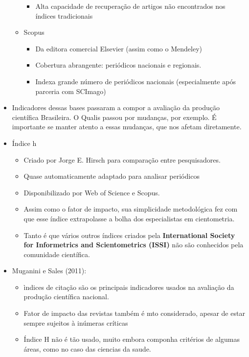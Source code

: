 \documentclass[11pt]{article}
\begin{document}
\begin{itemize}
\begin{itemize}
\begin{itemize}
\item Alta capacidade de recuperação de artigos não encontrados nos índices tradicionais
\end{itemize}

\item Scopus

\begin{itemize}
\item Da editora comercial Elsevier (assim como o Mendeley)

\item Cobertura abrangente: periódicos nacionais e regionais.

\item Indexa grande número de periódicos nacionais (especialmente após parceria com SCImago)
\end{itemize}
\end{itemize}

\item Indicadores dessas bases passaram a compor a avaliação da produção científica Brasileira. O Qualis passou por mudanças, por exemplo. É importante se manter atento a essas mudanças, que nos afetam diretamente.

\item Índice h

\begin{itemize}
\item Criado por Jorge E. Hirsch para comparação entre pesquisadores.

\item Quase automaticamente adaptado para analisar periódicos

\item Disponibilizado por Web of Science e Scopus.

\item Assim como o fator de impacto, sua simplicidade metodológica fez com que esse índice extrapolasse a bolha dos especialistas em cientometria.

\item Tanto é que vários outros índices criados pela \textbf{International Society for Informetrics and Scientometrics (ISSI)} não são conhecidos pela comunidade científica.
\end{itemize}

\item Muganini e Sales (2011):

\begin{itemize}
\item ìndices de citação são os principais indicadores usados na avaliação da produção científica nacional.

\item Fator de impacto das revistas também é mto considerado, apesar de estar sempre sujeitos à inúmeras críticas

\item Índice H não é tão usado, muito embora componha critérios de algumas áreas, como no caso das ciencias da saude.
\end{itemize}
\end{itemize}
\end{document}
